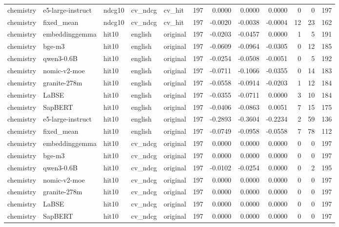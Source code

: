 \begin{tabular}{lllllrrrrrrr}
chemistry & e5-large-instruct & ndcg10 & cv\_ndcg & cv\_hit & 197 & 0.0000 & 0.0000 & 0.0000 & 0 & 0 & 197 \\
chemistry & fixed\_mean & ndcg10 & cv\_ndcg & cv\_hit & 197 & -0.0020 & -0.0038 & -0.0004 & 12 & 23 & 162 \\
chemistry & embeddinggemma & hit10 & english & original & 197 & -0.0203 & -0.0457 & 0.0000 & 1 & 5 & 191 \\
chemistry & bge-m3 & hit10 & english & original & 197 & -0.0609 & -0.0964 & -0.0305 & 0 & 12 & 185 \\
chemistry & qwen3-0.6B & hit10 & english & original & 197 & -0.0254 & -0.0508 & -0.0051 & 0 & 5 & 192 \\
chemistry & nomic-v2-moe & hit10 & english & original & 197 & -0.0711 & -0.1066 & -0.0355 & 0 & 14 & 183 \\
chemistry & granite-278m & hit10 & english & original & 197 & -0.0558 & -0.0914 & -0.0203 & 1 & 12 & 184 \\
chemistry & LaBSE & hit10 & english & original & 197 & -0.0355 & -0.0711 & 0.0000 & 3 & 10 & 184 \\
chemistry & SapBERT & hit10 & english & original & 197 & -0.0406 & -0.0863 & 0.0051 & 7 & 15 & 175 \\
chemistry & e5-large-instruct & hit10 & english & original & 197 & -0.2893 & -0.3604 & -0.2234 & 2 & 59 & 136 \\
chemistry & fixed\_mean & hit10 & english & original & 197 & -0.0749 & -0.0958 & -0.0558 & 7 & 78 & 112 \\
chemistry & embeddinggemma & hit10 & cv\_ndcg & original & 197 & 0.0000 & 0.0000 & 0.0000 & 0 & 0 & 197 \\
chemistry & bge-m3 & hit10 & cv\_ndcg & original & 197 & 0.0000 & 0.0000 & 0.0000 & 0 & 0 & 197 \\
chemistry & qwen3-0.6B & hit10 & cv\_ndcg & original & 197 & -0.0102 & -0.0254 & 0.0000 & 0 & 2 & 195 \\
chemistry & nomic-v2-moe & hit10 & cv\_ndcg & original & 197 & 0.0000 & 0.0000 & 0.0000 & 0 & 0 & 197 \\
chemistry & granite-278m & hit10 & cv\_ndcg & original & 197 & 0.0000 & 0.0000 & 0.0000 & 0 & 0 & 197 \\
chemistry & LaBSE & hit10 & cv\_ndcg & original & 197 & 0.0000 & 0.0000 & 0.0000 & 0 & 0 & 197 \\
chemistry & SapBERT & hit10 & cv\_ndcg & original & 197 & 0.0000 & 0.0000 & 0.0000 & 0 & 0 & 197 \\

\end{tabular}
